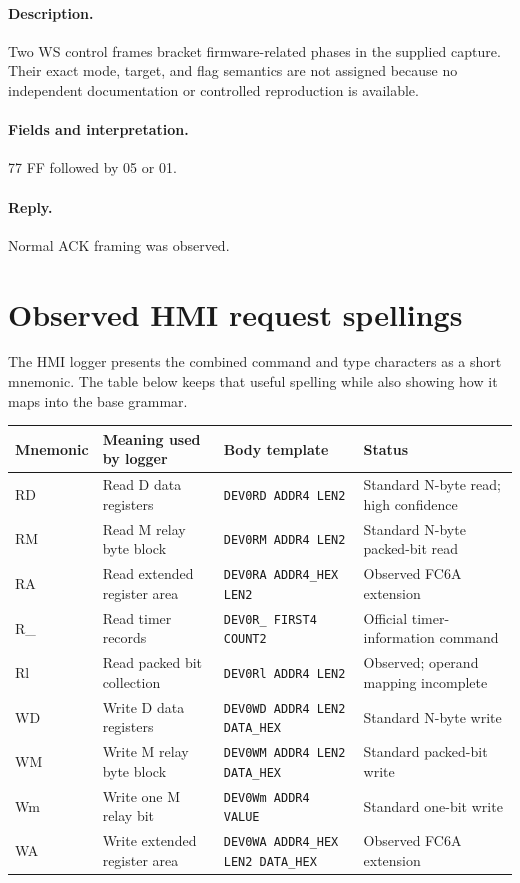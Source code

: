 \documentclass[10pt,letterpaper]{article}
\begin{document}
\paragraph{Description.} Two WS control frames bracket firmware-related phases in the supplied capture. Their exact mode, target, and flag semantics are not assigned because no independent documentation or controlled reproduction is available.
\paragraph{Fields and interpretation.}
\begin{description}[style=nextline,leftmargin=3.2cm,labelwidth=3.0cm,font=\normalfont\bfseries]
\item[Fixed observed bytes] 77 FF followed by 05 or 01.
\end{description}
\paragraph{Reply.} Normal ACK framing was observed.


\section{Observed HMI request spellings}
The HMI logger presents the combined command and type characters as a short mnemonic. The table below keeps that useful spelling while also showing how it maps into the base grammar.

\begin{longtable}{@{}p{1.5cm}p{4.0cm}p{5.2cm}p{4.2cm}@{}}
\toprule
Mnemonic & Meaning used by logger & Body template & Status \\
\midrule
RD & Read D data registers & \texttt{DEV0RD ADDR4 LEN2} & Standard N-byte read; high confidence \\
RM & Read M relay byte block & \texttt{DEV0RM ADDR4 LEN2} & Standard N-byte packed-bit read \\
RA & Read extended register area & \texttt{DEV0RA ADDR4\_HEX LEN2} & Observed FC6A extension \\
R\_ & Read timer records & \texttt{DEV0R\_ FIRST4 COUNT2} & Official timer-information command \\
Rl & Read packed bit collection & \texttt{DEV0Rl ADDR4 LEN2} & Observed; operand mapping incomplete \\
WD & Write D data registers & \texttt{DEV0WD ADDR4 LEN2 DATA\_HEX} & Standard N-byte write \\
WM & Write M relay byte block & \texttt{DEV0WM ADDR4 LEN2 DATA\_HEX} & Standard packed-bit write \\
Wm & Write one M relay bit & \texttt{DEV0Wm ADDR4 VALUE} & Standard one-bit write \\
WA & Write extended register area & \texttt{DEV0WA ADDR4\_HEX LEN2 DATA\_HEX} & Observed FC6A extension \\
\bottomrule
\end{longtable}
\end{document}

